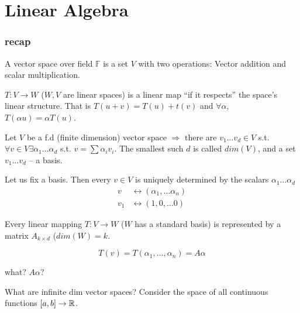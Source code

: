 \chapter{Linear Algebra}

\subsection{recap}
\begin{definition}
A vector space over field $\mathbb{F}$ is a set $V$ with two operations:
Vector addition and scalar multiplication.
\end{definition}

\begin{definition}
$T:V\to W$ ($W,V$ are linear spaces) is a linear map ``if it respects''
the space's linear structure. That is $T\left(u+v\right)=T\left(u\right)+t\left(v\right)$
and $\forall\alpha$, $T\left(\alpha u\right)=\alpha T\left(u\right)$.
\end{definition}

\begin{definition}
Let $V$ be a f.d (finite dimension) vector space $\Rightarrow$ there
are $v_{1}\dots v_{d}\in V$ s.t. $\forall v\in V\exists\alpha_{1}\dots\alpha_{d}$
s.t. $v=\sum\alpha_{i}v_{i}$. The smallest such $d$ is called $dim\left(V\right)$,
and a set $v_{1}\dots v_{d}$ -- a basis.
\end{definition}

\begin{claim}
Let us fix a basis. Then every $v\in V$ is uniquely determined by
the scalars $\alpha_{1}\dots\alpha_{d}$ 
\begin{align*}
v & \leftrightarrow\left(\alpha_{1},\dots\alpha_{n}\right)\\
v_{1} & \leftrightarrow\left(1,0,\dots0\right)
\end{align*}
\end{claim}

\begin{claim}
Every linear mapping $T:V\to W$ ($W$ has a standard basis) is represented
by a matrix $A_{k\times d}$ ($dim\left(W\right)=k$.
\end{claim}

\[
T\left(v\right)=T\left(\alpha_{1},\dots,\alpha_{n}\right)=A\alpha
\]
\begin{insight}
what? $A\alpha$?

What are infinite dim vector spaces? Consider the space of all continuous
functions $\left[a,b\right]\to\mathbb{R}$.%
\end{insight}

